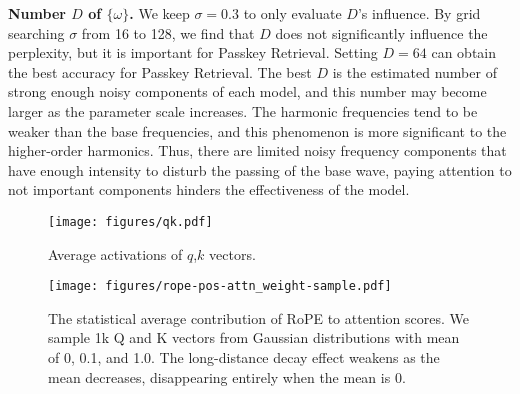 \textbf{Number $D$ of $\{\omega\}$.} We keep $\sigma=0.3$ to only evaluate $D$'s influence. By grid searching $\sigma$ from 16 to 128, we find that $D$ does not significantly influence the perplexity, but it is important for Passkey Retrieval. Setting $D=64$ can obtain the best accuracy for Passkey Retrieval. The best $D$ is the estimated number of strong enough noisy components of each model, and this number may become larger as the parameter scale increases. The harmonic frequencies tend to be weaker than the base frequencies, and this phenomenon is more significant to the higher-order harmonics. Thus, there are limited noisy frequency components that have enough intensity to disturb the passing of the base wave, paying attention to not important components hinders the effectiveness of the model.

\begin{figure}[t]
    \centering
    \texttt{[image: figures/qk.pdf]}
    \caption{Average activations of $q$,$k$ vectors.}
    \label{fig:qk}
\end{figure}

\begin{figure}[t]
    \centering
    \texttt{[image: figures/rope-pos-attn\_weight-sample.pdf]}
    \caption{The statistical average contribution of RoPE to attention scores. We sample 1k Q and K vectors from Gaussian distributions with mean of 0, 0.1, and 1.0. The long-distance decay effect weakens as the mean decreases, disappearing entirely when the mean is 0.}
    \label{fig:decay}
\end{figure}


